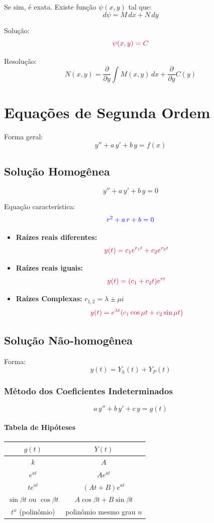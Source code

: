 \documentclass[a4paper,12pt]{article}
\begin{document}
Se sim, é exata. Existe função $\psi(x,y)$ tal que:
\[
d\psi = M\,dx+N\,dy
\]

Solução:
\[
\textcolor{purple}{\psi(x,y)=C}
\]

Resolução:
\[
N(x,y) = \frac{\partial}{\partial y} \int M(x,y)\,dx + \frac{\partial}{\partial y} C(y)
\]

\section*{Equações de Segunda Ordem}
Forma geral:
\[
y''+a\,y'+b\,y=f(x)
\]

\subsection*{Solução Homogênea}
\[
y''+a\,y'+b\,y=0
\]

Equação característica:
\[
\textcolor{blue}{r^2+a\,r+b=0}
\]

\begin{itemize}
    \item \textbf{Raízes reais diferentes:}
    \[
    \textcolor{purple}{y(t)=c_1e^{r_1t}+c_2e^{r_2t}}
    \]
    \item \textbf{Raízes reais iguais:}
    \[
    \textcolor{purple}{y(t)=(c_1+c_2t)e^{rt}}
    \]
    \item \textbf{Raízes Complexas:} $r_{1,2}=\lambda \pm \mu i$
    \[
    \textcolor{purple}{y(t)=e^{\lambda t}(c_1\cos \mu t + c_2\sin \mu t)}
    \]
\end{itemize}

\subsection*{Solução Não-homogênea}
Forma:
\[
y(t) = Y_h(t) + Y_P(t)
\]

\subsubsection*{Método dos Coeficientes Indeterminados}
\[
a\,y''+b\,y'+c\,y=g(t)
\]

\paragraph{Tabela de Hipóteses}
\begin{center}
\begin{tabular}{c|c}
$g(t)$ & $Y(t)$ \\ \hline
$k$ & $A$ \\
$e^{at}$ & $Ae^{at}$ \\
$t e^{at}$ & $(At+B)e^{at}$ \\
$\sin \beta t$ ou $\cos \beta t$ & $A\cos \beta t + B\sin \beta t$ \\
$t^n$ (polinômio) & polinômio mesmo grau $n$
\end{tabular}
\end{center}
\end{document}
